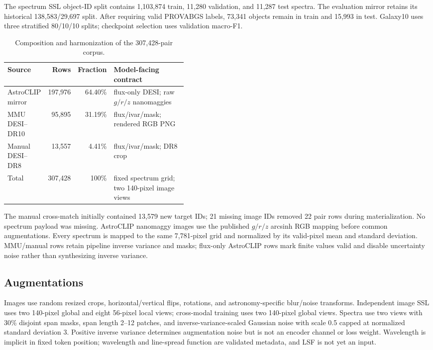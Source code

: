 \documentclass{article}
\begin{document}
The spectrum SSL object-ID split contains 1,103,874 train, 11,280 validation,
and 11,287 test spectra.
The evaluation mirror retains its historical 138,583/29,697 split.
After requiring valid PROVABGS labels, 73,341 objects remain in train and
15,993 in test.
Galaxy10 uses three stratified 80/10/10 splits; checkpoint selection uses
validation macro-F1.

\begin{table}[h]
\centering
\caption{Composition and harmonization of the 307,428-pair corpus.}
\label{tab:pair_sources}
\small
\setlength{\tabcolsep}{4pt}
\begin{tabular}{lrrp{0.42\linewidth}}
\toprule
Source & Rows & Fraction & Model-facing contract\\
\midrule
AstroCLIP mirror & 197,976 & 64.40\% & flux-only DESI; raw $g/r/z$ nanomaggies\\
MMU DESI--DR10 & 95,895 & 31.19\% & flux/ivar/mask; rendered RGB PNG\\
Manual DESI--DR8 & 13,557 & 4.41\% & flux/ivar/mask; DR8 crop\\
\midrule
Total & 307,428 & 100\% & fixed spectrum grid; two 140-pixel image views\\
\bottomrule
\end{tabular}
\end{table}

The manual cross-match initially contained 13,579 new target IDs; 21 missing
image IDs removed 22 pair rows during materialization.
No spectrum payload was missing.
AstroCLIP nanomaggy images use the published $g/r/z$ arcsinh RGB mapping before
common augmentations.
Every spectrum is mapped to the same 7,781-pixel grid and normalized by its
valid-pixel mean and standard deviation.
MMU/manual rows retain pipeline inverse variance and masks; flux-only
AstroCLIP rows mark finite values valid and disable uncertainty noise rather
than synthesizing inverse variance.

\subsection{Augmentations}

Images use random resized crops, horizontal/vertical flips, rotations, and
astronomy-specific blur/noise transforms.
Independent image SSL uses two 140-pixel global and eight 56-pixel local views;
cross-modal training uses two 140-pixel global views.
Spectra use two views with 30\% disjoint span masks, span length 2--12 patches,
and inverse-variance-scaled Gaussian noise with scale 0.5 capped at normalized
standard deviation 3.
Positive inverse variance determines augmentation noise but is not an encoder
channel or loss weight.
Wavelength is implicit in fixed token position; wavelength and line-spread
function are validated metadata, and LSF is not yet an input.
\end{document}
